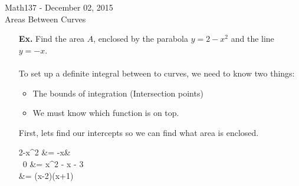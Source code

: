 \documentclass{letter}
\begin{document}
	\begin{center}
		\LARGE Math137 - December 02, 2015\\
		\large Areas Between Curves
	\end{center}
	\vspace{0.25 in}
	
	\begin{itemize}
		\item[\textbf{Ex. }] Find the area $A$, enclosed by the parabola $y = 2 - x^2$ and the line $y = -x$.\\\\
		To set up a definite integral between to curves, we need to know two things:
		\begin{itemize}
			\item The bounds of integration (Intersection points)
			\item We must know which function is on top.
		\end{itemize}
		
		First, lets find our intercepts so we can find what area is enclosed.
		\begin{flalign*}
			2-x^2 &= -x&\\\
			0 &= x^2 - x - 3\\
			&= (x-2)(x+1) 
		\end{flalign*}
		

\end{itemize}
\end{document}
